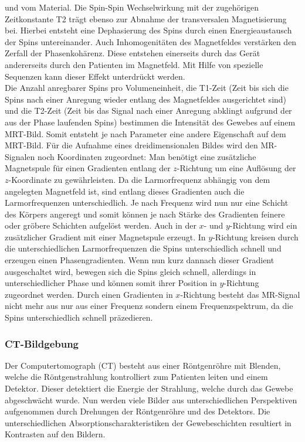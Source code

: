 und vom Material.  Die Spin-Spin Wechselwirkung mit der zugehörigen
Zeitkonstante T2 trägt ebenso zur Abnahme der transversalen Magnetisierung bei.
Hierbei entsteht eine Dephasierung des Spins durch einen Energieaustausch der
Spins untereinander.  Auch Inhomogenitäten des Magnetfeldes verstärken den
Zerfall der Phasenkohärenz. Diese entstehen einerseits durch das Gerät
andererseits durch den Patienten im Magnetfeld. Mit Hilfe von spezielle
Sequenzen kann dieser Effekt unterdrückt werden.\\
Die Anzahl anregbarer Spins pro Volumeneinheit, die T1-Zeit (Zeit bis sich die
Spins nach einer Anregung wieder entlang des Magnetfeldes ausgerichtet sind)
und die T2-Zeit (Zeit bis das Signal nach einer Anregung abklingt aufgrund der
aus der Phase laufenden Spins) bestimmen die Intensität des Gewebes auf einem
MRT-Bild. Somit entsteht je nach Parameter eine andere Eigenschaft auf dem
MRT-Bild. Für die Aufnahme eines dreidimensionalen Bildes wird den MR-Signalen
noch Koordinaten zugeordnet: Man benötigt eine zusätzliche Magnetspule für
einen Gradienten entlang der $z$-Richtung um eine Auflösung der $z$-Koordinate
zu gewährleisten. Da die Larmorfrequenz abhängig von dem angelegten Magnetfeld
ist, sind entlang dieses Gradienten auch die Larmorfrequenzen unterschiedlich.
Je nach Frequenz wird nun nur eine Schicht des Körpers angeregt und somit
können je nach Stärke des Gradienten feinere oder gröbere Schichten aufgelöst
werden. Auch in der $x$- und $y$-Richtung wird ein zusätzlicher Gradient mit
einer Magnetspule erzeugt. In $y$-Richtung kreisen durch die unterschiedlichen
Larmorfrequenzen die Spins unterschiedlich schnell und erzeugen einen
Phasengradienten. Wenn nun kurz dannach dieser Gradient ausgeschaltet wird,
bewegen sich die Spins gleich schnell, allerdings in unterschiedlicher Phase
und können somit ihrer Position in $y$-Richtung zugeordnet werden. Durch einen
Gradienten in $x$-Richtung besteht das MR-Signal nicht mehr aus nur aus einer
Frequenz sondern einem Frequenzspektrum, da die Spins unterschiedlich schnell
präzedieren.

\subsubsection{CT-Bildgebung}
Der Computertomograph (CT) besteht aus einer Röntgenröhre mit Blenden, welche
die Röntgenstrahlung kontrolliert zum Patienten leiten und einem Detektor.
Dieser detektiert die Energie der Strahlung, welche durch das Gewebe
abgeschwächt wurde. Nun werden viele Bilder aus unterschiedlichen Perspektiven
aufgenommen durch Drehungen der Röntgenröhre und des Detektors. Die
unterschiedlichen Absorptionscharakteristiken der Gewebeschichten resultiert in
Kontrasten auf den Bildern.


